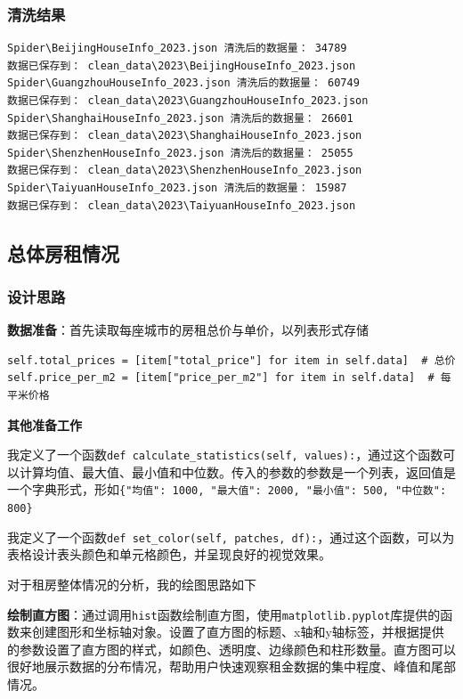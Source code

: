 \documentclass[lang=cn,11pt,a4paper]{elegantpaper}
\begin{document}
\subsubsection{清洗结果}

\begin{lstlisting}[language=text]
Spider\BeijingHouseInfo_2023.json 清洗后的数据量： 34789
数据已保存到： clean_data\2023\BeijingHouseInfo_2023.json
Spider\GuangzhouHouseInfo_2023.json 清洗后的数据量： 60749
数据已保存到： clean_data\2023\GuangzhouHouseInfo_2023.json
Spider\ShanghaiHouseInfo_2023.json 清洗后的数据量： 26601
数据已保存到： clean_data\2023\ShanghaiHouseInfo_2023.json
Spider\ShenzhenHouseInfo_2023.json 清洗后的数据量： 25055
数据已保存到： clean_data\2023\ShenzhenHouseInfo_2023.json
Spider\TaiyuanHouseInfo_2023.json 清洗后的数据量： 15987
数据已保存到： clean_data\2023\TaiyuanHouseInfo_2023.json
\end{lstlisting}


\subsection{总体房租情况}

\subsubsection{设计思路}
\textbf{数据准备}：首先读取每座城市的房租总价与单价，以列表形式存储

\begin{lstlisting}
self.total_prices = [item["total_price"] for item in self.data]  # 总价
self.price_per_m2 = [item["price_per_m2"] for item in self.data]  # 每平米价格
\end{lstlisting}

\textbf{其他准备工作}

我定义了一个函数\lstinline{def calculate_statistics(self, values):}，通过这个函数可以计算均值、最大值、最小值和中位数。传入的参数的参数是一个列表，返回值是一个字典形式，形如\lstinline'{"均值": 1000, "最大值": 2000, "最小值": 500, "中位数": 800}'

我定义了一个函数\lstinline{def set_color(self, patches, df):}，通过这个函数，可以为表格设计表头颜色和单元格颜色，并呈现良好的视觉效果。

对于租房整体情况的分析，我的绘图思路如下

\textbf{绘制直方图}：通过调用\lstinline{hist}函数绘制直方图，使用\lstinline{matplotlib.pyplot}库提供的函数来创建图形和坐标轴对象。设置了直方图的标题、x轴和y轴标签，并根据提供的参数设置了直方图的样式，如颜色、透明度、边缘颜色和柱形数量。直方图可以很好地展示数据的分布情况，帮助用户快速观察租金数据的集中程度、峰值和尾部情况。
\end{document}
